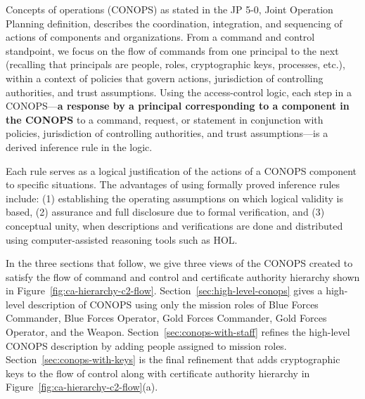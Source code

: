 \documentclass[10pt,twoside]{article}
\begin{document}
\begin{center}
\end{center}

Concepts of operations (CONOPS) as stated in the JP 5-0, Joint
Operation Planning definition, describes the coordination,
integration, and sequencing of actions of components and
organizations.  From a command and control standpoint, we focus on the
flow of commands from one principal to the next (recalling that
principals are people, roles, cryptographic keys, processes, etc.),
within a context of policies that govern actions, jurisdiction of
controlling authorities, and trust assumptions.  Using the
access-control logic, each step in a CONOPS---\textbf{a response by a
  principal corresponding to a component in the CONOPS} to a command,
request, or statement in conjunction with policies, jurisdiction of
controlling authorities, and trust assumptions---is a derived
inference rule in the logic. 

Each rule serves as a logical justification of the actions of a CONOPS
component to specific situations. The advantages of using formally
proved inference rules include: (1) establishing the operating
assumptions on which logical validity is based, (2) assurance and full
disclosure due to formal verification, and (3) conceptual unity, when
descriptions and verifications are done and distributed using
computer-assisted reasoning tools such as HOL.

In the three sections that follow, we give three views of the CONOPS
created to satisfy the flow of command and control and certificate
authority hierarchy shown in
Figure~\ref{fig:ca-hierarchy-c2-flow}. Section~\ref{sec:high-level-conops}
gives a high-level description of CONOPS using only the mission roles
of Blue Forces Commander, Blue Forces Operator, Gold Forces Commander,
Gold Forces Operator, and the
Weapon. Section~\ref{sec:conops-with-staff} refines the high-level
CONOPS description by adding people assigned to mission
roles. Section~\ref{sec:conops-with-keys} is the final refinement that
adds cryptographic keys to the flow of control along with certificate
authority hierarchy in Figure~\ref{fig:ca-hierarchy-c2-flow}(a).
\end{document}
